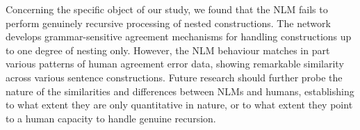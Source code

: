 Concerning the specific object of our study, we found that the NLM fails to perform genuinely recursive processing of nested constructions. The network develops grammar-sensitive agreement mechanisms for handling  constructions up to one degree of nesting only. However, the NLM behaviour matches in part various patterns of human agreement error data, showing remarkable similarity across various sentence constructions. Future research should further probe the nature of the similarities and differences between NLMs and humans, establishing to what extent they are only quantitative in nature, or to what extent they point to a human capacity to handle genuine recursion.